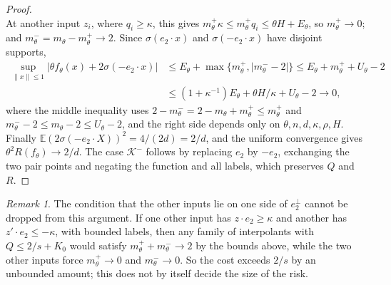 \documentclass[11pt]{amsart}
\theoremstyle{remark}
\newtheorem{remark}[theorem]{Remark}
\numberwithin{equation}{section}
\newcommand{\EE}{\mathbb{E}}
\begin{document}
\begin{proof}
\[\]
At another input $z_i$, where $q_i\ge\kappa$, this gives $m^+_\theta\kappa\le m^+_\theta q_i\le\theta H+E_\theta$, so $m^+_\theta\to0$; and $m^-_\theta=m_\theta-m^+_\theta\to2$. Since $\sigma(e_2\cdot x)$ and $\sigma(-e_2\cdot x)$ have disjoint supports,
\[
\begin{aligned}
\sup_{\|x\|\le1}|\theta f_\theta(x)+2\sigma(-e_2\cdot x)|&\le E_\theta+\max\{m^+_\theta,|m^-_\theta-2|\}\le E_\theta+m^+_\theta+U_\theta-2\\
&\le(1+\kappa^{-1})E_\theta+\theta H/\kappa+U_\theta-2\to0,
\end{aligned}
\]
where the middle inequality uses $2-m^-_\theta=2-m_\theta+m^+_\theta\le m^+_\theta$ and $m^-_\theta-2\le m_\theta-2\le U_\theta-2$,
and the right side depends only on $\theta,n,d,\kappa,\rho,H$. Finally $\EE(2\sigma(-e_2\cdot X))^2=4/(2d)=2/d$, and the uniform convergence gives $\theta^2R(f_\theta)\to2/d$. The case $\mathcal K^-$ follows by replacing $e_2$ by $-e_2$, exchanging the two pair points and negating the function and all labels, which preserves $Q$ and $R$.
\end{proof}

\begin{remark}\label{rem:sides}
The condition that the other inputs lie on one side of $e_2^\perp$ cannot be dropped from this argument. If one other input has $z\cdot e_2\ge\kappa$ and another has $z'\cdot e_2\le-\kappa$, with bounded labels, then any family of interpolants with $Q\le2/s+K_0$ would satisfy $m^+_\theta+m^-_\theta\to2$ by the bounds above, while the two other inputs force $m^+_\theta\to0$ and $m^-_\theta\to0$. So the cost exceeds $2/s$ by an unbounded amount; this does not by itself decide the size of the risk.
\end{remark}
\end{document}
